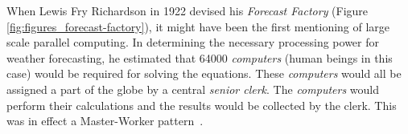 \documentclass{sig-alternate}
\begin{document}







When Lewis Fry Richardson in 1922 devised his \textit{Forecast Factory} (Figure 
\ref{fig:figures_forecast-factory}), it might have been the first
mentioning of large scale parallel computing.
In determining the necessary processing power for weather forecasting, he
estimated that 64000 \textit{computers} (human beings in this case) would be
required for solving the equations.
These \textit{computers} would all be assigned a part of the globe by a central
\textit{senior clerk}.
The \textit{computers} would perform their calculations and the results would
be collected by the clerk.
This was in effect a Master-Worker 
pattern~\cite{Shao:2000:masterslave}.
\end{document}
